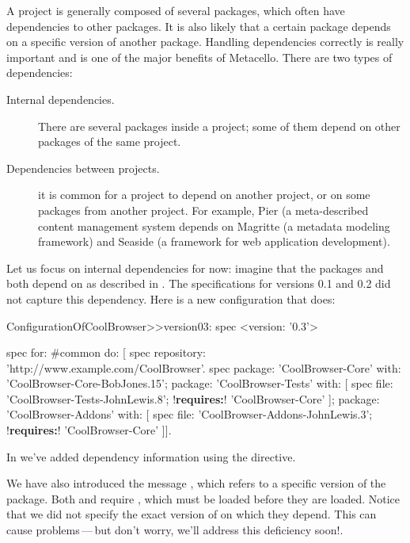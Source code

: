\documentclass[a4paper,10pt,twoside]{book}
\begin{document}
A project is generally composed of several packages, which often have dependencies to other packages.  It is also likely that a certain package depends on a specific version of another package. Handling dependencies correctly is really important and  is one of the major benefits of Metacello. There are two types of dependencies:
\begin{description}
\item[Internal dependencies.] There are several packages inside a project; some of them depend on other packages of the same project.
\item[Dependencies between projects.] it is common for a project to depend on another project, or on some packages from another project.
For example, Pier (a meta-described content management system depends on Magritte (a metadata modeling framework) and Seaside (a framework for web application development).
\end{description}



Let us focus on internal dependencies for now: imagine that the packages  and  both depend on  as described in . The specifications for versions 0.1 and 0.2 did not capture this dependency. Here is a new configuration that does:

\begin{code}{}
ConfigurationOfCoolBrowser>>version03: spec
       <version: '0.3'>

       spec for: #common do: [
              spec repository: 'http://www.example.com/CoolBrowser'.
              spec
                     package: 'CoolBrowser-Core' with: 'CoolBrowser-Core-BobJones.15';
                     package: 'CoolBrowser-Tests' with: [
                            spec
                                   file: 'CoolBrowser-Tests-JohnLewis.8';
                                   !\textbf{requires:}! 'CoolBrowser-Core' ];
                     package: 'CoolBrowser-Addons' with: [
                            spec
                                   file: 'CoolBrowser-Addons-JohnLewis.3';
                                   !\textbf{requires:}! 'CoolBrowser-Core' ]].
\end{code}

\noindent
In  we've added dependency information using the  directive.

We have also introduced the  message%
, which refers to a specific version   of the package. Both  and   require , which must be loaded before they are loaded.
Notice that we did not specify the exact version of  on which they depend.  This can cause problems\,---\,but don't worry, we'll address this deficiency soon!.
\end{document}
